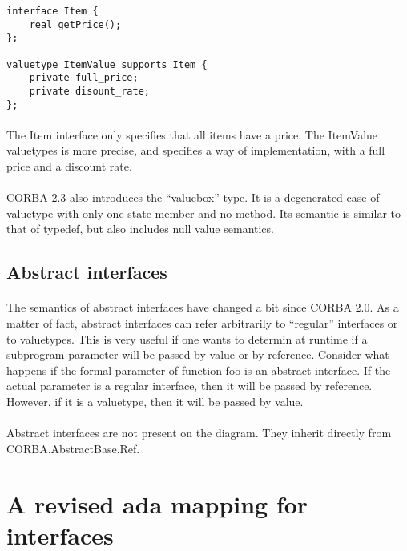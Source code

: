 \begin{verbatim}
interface Item {
	real getPrice();
};

valuetype ItemValue supports Item {
	private full_price;
	private disount_rate;
};
\end{verbatim}
\paragraph{}The Item interface only specifies that all items have a price. The
ItemValue valuetypes is more precise, and specifies a way of
implementation, with a full price and a discount rate.

\paragraph{}CORBA 2.3 also introduces the ``valuebox'' type. It is a
degenerated case of valuetype with only one state member and no
method. Its semantic is similar to that of typedef, but also includes
null value semantics.


\subsection{Abstract interfaces}
\paragraph{}The semantics of abstract interfaces have changed a bit since CORBA
2.0. As a matter of fact, abstract interfaces can refer arbitrarily to
``regular'' interfaces or to valuetypes. This is very useful if one
wants to determin at runtime if a subprogram parameter will be passed
by value or by reference. Consider what happens if the formal
parameter of function foo is an abstract interface. If the actual
parameter is a regular interface, then it will be passed by
reference. However, if it is a valuetype, then it will be passed by
value.

\paragraph{}
Abstract interfaces are not present on the diagram.
They inherit
directly from \\
CORBA.AbstractBase.Ref.


\section{A revised ada mapping for interfaces}

